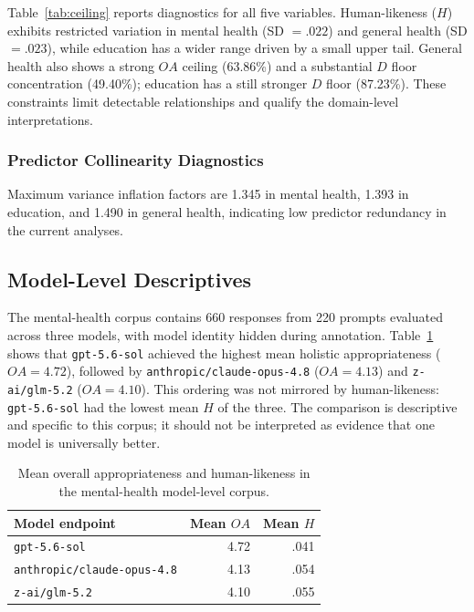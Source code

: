 \documentclass[manuscript,review,anonymous]{acmart}
\begin{document}
Table~\ref{tab:ceiling} reports diagnostics for all five variables. Human-likeness ($H$) exhibits restricted variation in mental health (SD $=.022$) and general health (SD $=.023$), while education has a wider range driven by a small upper tail. General health also shows a strong $OA$ ceiling (63.86\%) and a substantial $D$ floor concentration (49.40\%); education has a still stronger $D$ floor (87.23\%). These constraints limit detectable relationships and qualify the domain-level interpretations.

\subsubsection{Predictor Collinearity Diagnostics}

Maximum variance inflation factors are 1.345 in mental health, 1.393 in education, and 1.490 in general health, indicating low predictor redundancy in the current analyses.

\subsection{Model-Level Descriptives}

The mental-health corpus contains 660 responses from 220 prompts evaluated across three models, with model identity hidden during annotation. Table~\ref{tab:model-oa} shows that \texttt{gpt-5.6-sol} achieved the highest mean holistic appropriateness ($OA=4.72$), followed by \texttt{anthropic/claude-opus-4.8} ($OA=4.13$) and \texttt{z-ai/glm-5.2} ($OA=4.10$). This ordering was not mirrored by human-likeness: \texttt{gpt-5.6-sol} had the lowest mean $H$ of the three. The comparison is descriptive and specific to this corpus; it should not be interpreted as evidence that one model is universally better.

\begin{table}[t]
\centering
\small
\caption{Mean overall appropriateness and human-likeness in the mental-health model-level corpus.}
\label{tab:model-oa}
\begin{tabular}{lrr}
\toprule
Model endpoint & Mean $OA$ & Mean $H$ \\
\midrule
\texttt{gpt-5.6-sol} & 4.72 & .041 \\
\texttt{anthropic/claude-opus-4.8} & 4.13 & .054 \\
\texttt{z-ai/glm-5.2} & 4.10 & .055 \\
\bottomrule
\end{tabular}
\end{table}
\end{document}
